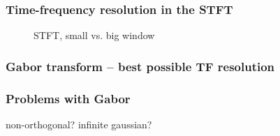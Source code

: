 \documentclass{beamer}
\begin{document}
\begin{frame}
	\frametitle{Time-frequency resolution in the STFT}
	\begin{figure}
		\centering
		\caption{STFT, small vs. big window}
	\end{figure}
\end{frame}

\begin{frame}
	\frametitle{Gabor transform -- best possible TF resolution}
\end{frame}

\begin{frame}
	\frametitle{Problems with Gabor}
	non-orthogonal? infinite gaussian?
\end{frame}
\end{document}
